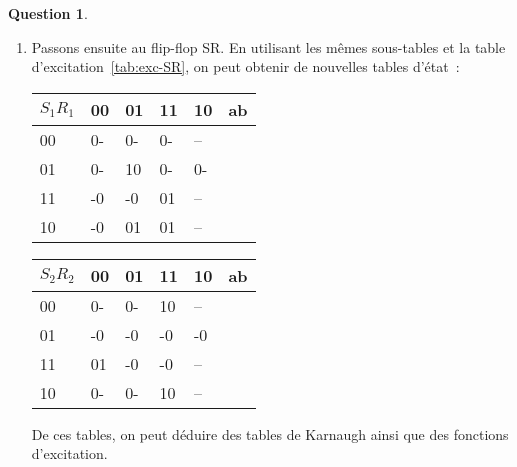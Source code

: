 \documentclass[11pt,a4paper,dvipsnames,]{article}
\theoremstyle{definition}%
\newtheorem{Q}{Question}[] %
\begin{document}
\begin{Q}
{\begin{enumerate}
			\item Passons ensuite au flip-flop SR.
			En utilisant les mêmes sous-tables et la table d'excitation~\ref{tab:exc-SR}, on peut obtenir de nouvelles tables d'état~:
			\begin{center}
				\begin{tabular}{|l|l|l|l|l|l} \hline
				$S_1R_1$ & 00         & 01         & 11         & 10         & \multicolumn{1}{l|}{ab} \\ \hline
				00           & 0- & 0- & 0- & -- & \\ \cline{1-5}
				01           & 0- & 10 & 0- & 0- & \\ \cline{1-5}
				11           & -0 & -0 & 01 & -- & \\ \cline{1-5}
				10           & -0 & 01 & 01 & -- & \\ \cline{1-5}
				\end{tabular}
				\begin{tabular}{|l|l|l|l|l|l} \hline
				$S_2R_2$ & 00         & 01         & 11         & 10         & \multicolumn{1}{l|}{ab} \\ \hline
				00           & 0- & 0- & 10 & -- & \\ \cline{1-5}
				01           & -0 & -0 & -0 & -0 & \\ \cline{1-5}
				11           & 01 & -0 & -0 & -- & \\ \cline{1-5}
				10           & 0- & 0- & 10 & -- & \\ \cline{1-5}
				\end{tabular}
			\end{center}

			De ces tables, on peut déduire des tables de Karnaugh ainsi que des fonctions d'excitation.
			\begin{center}



			\end{center}

		\end{enumerate}
	}

\end{Q}
\end{document}
